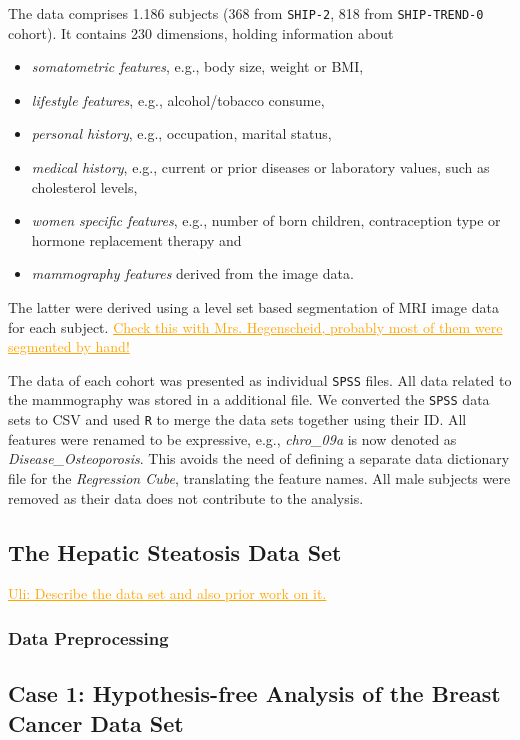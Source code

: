 \documentclass[journal]{style/vgtc} 			          %
\newcommand{\com}[1]{\textcolor{orange}{\uline{#1}}}
\begin{document}
The data comprises 1.186 subjects (368 from \texttt{SHIP-2}, 818 from \texttt{SHIP-TREND-0} cohort).
It contains 230 dimensions, holding information about
\begin{itemize}
	\item \emph{somatometric features}, e.g., body size, weight or BMI, 
	\item \emph{lifestyle features}, e.g., alcohol/tobacco consume, 
	\item \emph{personal history}, e.g., occupation, marital status,
	\item \emph{medical history}, e.g., current or prior diseases or laboratory values, such as cholesterol levels,
	\item \emph{women specific features}, e.g., number of born children, contraception type or hormone replacement therapy and
	\item \emph{mammography features} derived from the image data.
\end{itemize}
The latter were derived using a level set based segmentation \cite{Ivanovska2014} of MRI image data for each subject.
\com{Check this with Mrs. Hegenscheid, probably most of them were segmented by hand!}

The data of each cohort was presented as individual \texttt{SPSS} files.
All data related to the mammography was stored in a additional file.
We converted the \texttt{SPSS} data sets to CSV and used \texttt{R} to merge the data sets together using their ID.
All features were renamed to be expressive, e.g., \emph{chro\_09a} is now denoted as \emph{Disease\_Osteoporosis}.
This avoids the need of defining a separate data dictionary file for the \emph{Regression Cube}, translating the feature names.
All male subjects were removed as their data does not contribute to the analysis.
\subsection{The Hepatic Steatosis Data Set}
\com{Uli: Describe the data set and also prior work on it.}
\subsubsection{Data Preprocessing}
\subsection{Case 1: Hypothesis-free Analysis of the Breast Cancer Data Set}
\end{document}
